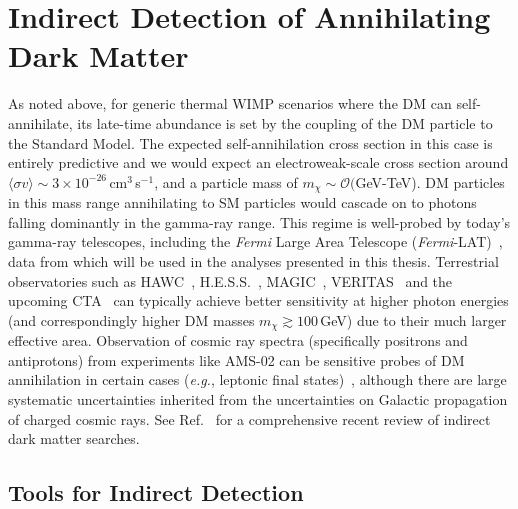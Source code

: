 \section{Indirect Detection of Annihilating Dark Matter}
\label{sec:astrodm}

As noted above, for generic thermal WIMP scenarios where the DM can self-annihilate, its late-time abundance is set by the coupling of the DM particle to the Standard Model. The expected self-annihilation cross section in this case is entirely predictive and we would expect an electroweak-scale cross section around $\langle\sigma v\rangle\sim 3\times10^{-26}$\,cm$^3$\,s$^{-1}$, and a particle mass of $m_\chi\sim\mathcal O($GeV-TeV). DM particles in this mass range annihilating to SM particles would cascade on to photons falling dominantly in the gamma-ray range. This regime is well-probed by today's gamma-ray telescopes, including the \emph{Fermi} Large Area Telescope (\emph{Fermi}-LAT)~\cite{Atwood:2009ez}, data from which will be used in the analyses presented in this thesis. Terrestrial observatories such as HAWC~\cite{Abeysekara:2014ffg}, H.E.S.S.~\cite{Abdallah:2018qtu}, MAGIC~\cite{Ahnen:2017pqx}, VERITAS~\cite{Archambault:2017wyh} and the upcoming CTA~\cite{Doro:2012xx} can typically achieve better sensitivity at higher photon energies (and correspondingly higher DM masses $m_\chi\gtrsim 100$\,GeV) due to their much larger effective area. Observation of cosmic ray spectra (specifically positrons and antiprotons) from experiments like AMS-02 can be sensitive probes of DM annihilation in certain cases (\emph{e.g.}, leptonic final states)~\cite{Aguilar:2014mma,Bergstrom:2013jra}, although there are large systematic uncertainties inherited from the uncertainties on Galactic propagation of charged cosmic rays. See Ref.~\cite{Slatyer:2017sev} for a comprehensive recent review of indirect dark matter searches.   %

\subsection{Tools for Indirect Detection}
\label{subsec:tools}

